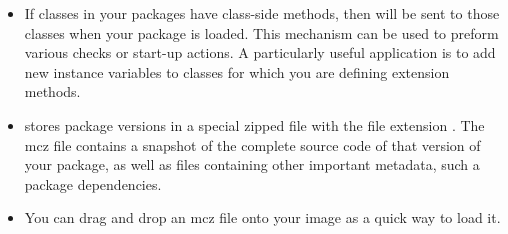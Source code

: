 \documentclass[a4paper,10pt,twoside]{book}
\begin{document}
\begin{itemize}
\item If classes in your packages have class-side  methods, then  will be sent to those classes when your package is loaded. This mechanism can be used to preform various checks or start-up actions. A particularly useful application is to add new instance variables to classes for which you are defining extension methods.

\item \MC stores package versions in a special zipped file with the file extension . The mcz file contains a snapshot of the complete source code of that version of your package, as well as files containing other important metadata, such a package dependencies.

\item You can drag and drop an mcz file onto your image as a quick way to load it.






\end{itemize}


\end{document}
